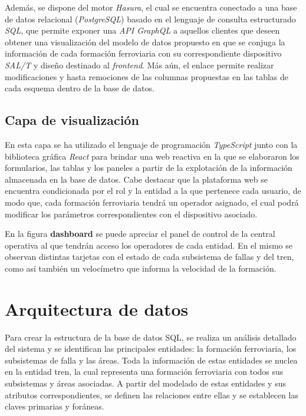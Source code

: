 Además, se dispone del motor \textit{Hasura}, el cual se encuentra conectado a una base de datos relacional (\textit{PostgreSQL}) basado en el lenguaje de consulta estructurado \textit{SQL}, que permite exponer una \textit{API GraphQL} a aquellos clientes que deseen obtener una visualización del modelo de datos propuesto en que se conjuga la información de cada formación ferroviaria con su correspondiente dispositivo \textit{SAL/T} y diseño destinado al \textit{frontend}. Más aún, el enlace permite realizar modificaciones y hasta remociones de las columnas propuestas en las tablas de cada esquema dentro de la base de datos.


\subsection{Capa de visualización}

En esta capa se ha utilizado el lenguaje de programación \textit{TypeScript} junto con la biblioteca gráfica \textit{React} para brindar una web reactiva en la que se elaboraron los formularios, las tablas y los paneles a partir de la explotación de la información almacenada en la base de datos. Cabe destacar que la plataforma web se encuentra condicionada por el rol y la entidad a la que pertenece cada usuario, de modo que, cada formación ferroviaria tendrá un operador asignado, el cual podrá modificar los parámetros correspondientes con el dispositivo asociado.

En la figura \textbf{dashboard} se puede apreciar el panel de control de la central operativa al que tendrán acceso los operadores de cada entidad.
En el mismo se observan distintas tarjetas con el estado de cada subsistema de fallas y del tren, como así también un velocímetro que informa la velocidad de la formación.

\newpage
\section{Arquitectura de datos}

Para crear la estructura de la base de datos SQL, se realiza un análisis detallado del sistema y se identifican las principales entidades: la formación ferroviaria, los subsistemas de falla y las áreas. Toda la información de estas entidades se nuclea en la entidad tren, la cual representa una formación ferroviaria con todos sus subsistemas y áreas asociadas. A partir del modelado de estas entidades y sus atributos correspondientes, se definen las relaciones entre ellas y se establecen las claves primarias y foráneas.


